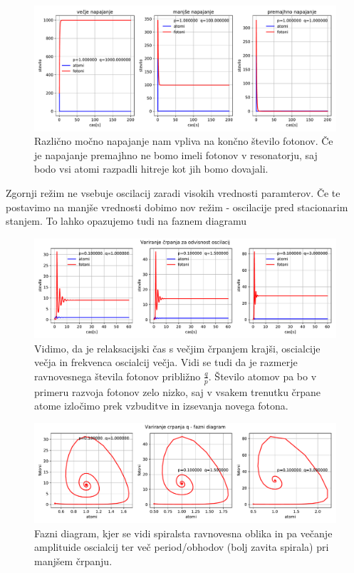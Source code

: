 \documentclass[11pt, a4paper]{article}
\begin{document}
\begin{figure}[htb!]
  \centering
  \includegraphics[width=18cm]{laser_razlicno_napajanje.pdf}
  \caption{Različno močno napajanje nam vpliva na končno število fotonov. Če je napajanje premajhno ne bomo imeli fotonov v resonatorju, saj bodo vsi atomi razpadli hitreje kot jih bomo dovajali. }
\end{figure}
Zgornji režim ne vsebuje oscilacij zaradi visokih vrednosti paramterov. Če te postavimo na manjše vrednosti dobimo nov režim - oscilacije pred stacionarim stanjem.\newline\newline
To lahko opazujemo tudi na faznem diagramu

\begin{figure}[htb!]
  \centering
  \includegraphics[width=18cm]{laser_oscilacije_crpanje.pdf}
  \caption{Vidimo, da je relaksacijski čas s večjim črpanjem krajši, oscialcije večja in frekvenca oscialcij večja. Vidi se tudi da je razmerje ravnovesnega števila fotonov približno $\frac{q}{p}$. Število atomov pa bo v primeru razvoja fotonov zelo nizko, saj v vsakem trenutku črpane atome izločimo prek vzbuditve in izsevanja novega fotona.  }
\end{figure}


\begin{figure}[htb!]
  \centering
  \includegraphics[width=18cm]{laser_oscilacije_crpanje_fazni_diagram.pdf}
  \caption{Fazni diagram, kjer se vidi spiralsta ravnovesna oblika in pa večanje amplituide oscialcij ter več period/obhodov (bolj zavita spirala) pri manjšem črpanju.}
\end{figure}
\end{document}
